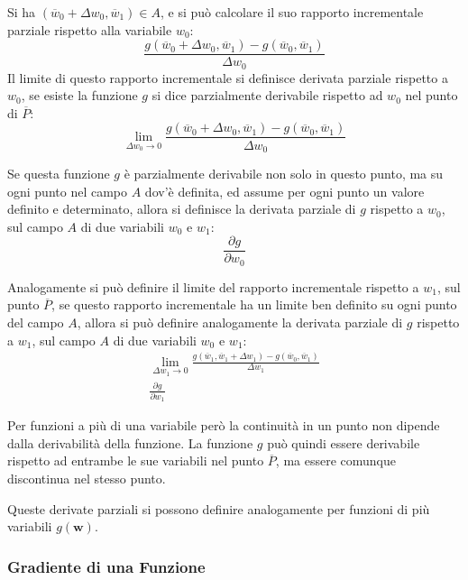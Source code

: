 \documentclass{article}
\numberwithin{equation}{subsection}
\newcommand{\vect}[1]{\boldsymbol{\mathbf{#1}}}
\begin{document}
Si ha $(\overline{w}_0+\Delta w_0, \overline{w}_1)\in A$, e si può calcolare il suo rapporto incrementale parziale rispetto alla variabile $w_0$:
\begin{equation*}
    \displaystyle\frac{g(\overline{w}_0+\Delta w_0,\overline{w}_1)-g(\overline{w}_0,\overline{w}_1)}{\Delta w_0}
\end{equation*}
Il limite di questo rapporto incrementale si definisce derivata parziale rispetto a $w_0$, 
se esiste la funzione $g$ si dice parzialmente derivabile rispetto ad $w_0$ nel punto di $\overline{P}$:
\begin{equation*}
    \lim_{\Delta w_0\to 0}\displaystyle\frac{g(\overline{w}_0+\Delta w_0,\overline{w}_1)-g(\overline{w}_0,\overline{w}_1)}{\Delta w_0}
\end{equation*} 

Se questa funzione $g$ è parzialmente derivabile non solo in questo punto, ma su ogni punto 
nel campo $A$ dov'è definita, ed assume per ogni punto un valore definito e determinato, 
allora si definisce la derivata parziale di $g$ rispetto a $w_0$, sul campo $A$ di due 
variabili $w_0$ e $w_1$:
\begin{equation}
    \displaystyle\frac{\partial g}{\partial w_0}
\end{equation}

Analogamente si può definire il limite del rapporto incrementale rispetto a $w_1$, sul 
punto $\overline{P}$, se questo rapporto incrementale ha un limite ben definito su ogni 
punto del campo $A$, allora si può definire analogamente la derivata parziale di 
$g$ rispetto a $w_1$, sul campo $A$ di due variabili $w_0$ e $w_1$:
\begin{gather*}
    \lim_{\Delta w_1\to 0}\displaystyle\frac{g(\overline{w}_1,\overline{w}_1+\Delta w_1)-g(\overline{w}_0,\overline{w}_1)}{\Delta w_1}\\
    \displaystyle\frac{\partial g}{\partial w_1}
\end{gather*}

Per funzioni a più di una variabile però la continuità in un punto non dipende dalla 
derivabilità della funzione. La funzione $g$ può quindi essere derivabile rispetto ad 
entrambe le sue variabili nel punto $\overline{P}$, ma essere comunque discontinua nel stesso punto. 

Queste derivate parziali si possono definire analogamente per funzioni di più variabili $g(\vect{w})$. 

\subsubsection{Gradiente di una Funzione}
\end{document}
